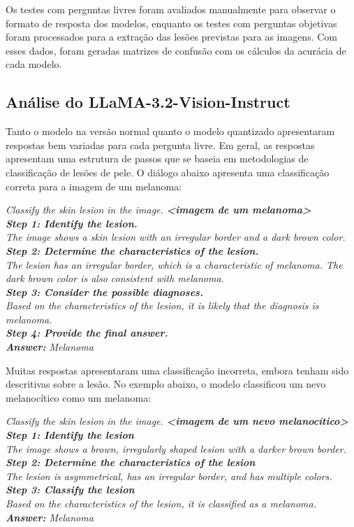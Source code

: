 Os testes com perguntas livres foram avaliados manualmente para observar o formato de resposta dos modelos, enquanto os
testes com perguntas objetivas foram processados para a extração das lesões previstas para as imagens. Com esses dados,
foram geradas matrizes de confusão com os cálculos da acurácia de cada modelo.

\subsection{Análise do LLaMA-3.2-Vision-Instruct}

Tanto o modelo na versão normal quanto o modelo quantizado apresentaram respostas bem variadas para cada pergunta
livre. Em geral, as respostas apresentam uma estrutura de passos que se baseia em metodologias de classificação de
lesões de pele. O diálogo abaixo apresenta uma classificação correta para a imagem de um melanoma:

\begin{dialogue}
     \textit{Classify the skin lesion in the image. \textbf{<imagem de um melanoma>}} \\
     \textit{\textbf{Step 1: Identify the lesion.} \\
    The image shows a skin lesion with an irregular border and a dark brown color. \\
    \textbf{Step 2: Determine the characteristics of the lesion.} \\
    The lesion has an irregular border, which is a characteristic of melanoma. The dark brown color is also consistent with melanoma. \\
    \textbf{Step 3: Consider the possible diagnoses.} \\
    Based on the characteristics of the lesion, it is likely that the diagnosis is melanoma. \\
    \textbf{Step 4: Provide the final answer.} \\
    \textbf{Answer:} Melanoma}
\end{dialogue}

Muitas respostas apresentaram uma classificação incorreta, embora tenham sido descritivas sobre a lesão. No exemplo
abaixo, o modelo classificou um nevo melanocítico como um melanoma:

\begin{dialogue}
     \textit{Classify the skin lesion in the image. \textbf{<imagem de um nevo melanocítico>}} \\
     \textit{\textbf{Step 1: Identify the lesion} \\
    The image shows a brown, irregularly shaped lesion with a darker brown border. \\
    \textbf{Step 2: Determine the characteristics of the lesion} \\
    The lesion is asymmetrical, has an irregular border, and has multiple colors. \\
    \textbf{Step 3: Classify the lesion} \\
    Based on the characteristics of the lesion, it is classified as a melanoma. \\
    \textbf{Answer:} Melanoma}
\end{dialogue}

